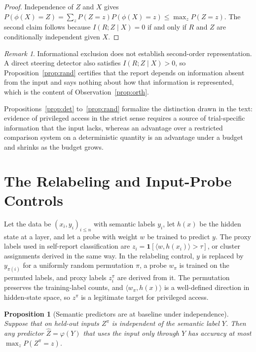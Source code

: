 \documentclass[11pt]{article}
\newtheorem{proposition}{Proposition}
\theoremstyle{definition}
\theoremstyle{remark}
\newtheorem{remark}{Remark}
\begin{document}
\begin{proof}
Independence of $Z$ and $X$ gives $P(\phi(X)=Z)=\sum_z P(Z=z)P(\phi(X)=z)\le\max_z P(Z=z)$. The second claim follows because $I(R;Z\mid X)=0$ if and only if $R$ and $Z$ are conditionally independent given $X$.
\end{proof}

\begin{remark}
Informational exclusion does not establish second-order representation. A direct steering detector also satisfies $I(R;Z\mid X)>0$, so Proposition~\ref{prop:rand} certifies that the report depends on information absent from the input and says nothing about how that information is represented, which is the content of Observation~\ref{prop:orth}.
\end{remark}

Propositions~\ref{prop:det} to~\ref{prop:rand} formalize the distinction drawn in the text: evidence of privileged access in the strict sense requires a source of trial-specific information that the input lacks, whereas an advantage over a restricted comparison system on a deterministic quantity is an advantage under a budget and shrinks as the budget grows.

\section{The Relabeling and Input-Probe Controls}\label{app:controls}

Let the data be $(x_i,y_i)_{i\le n}$ with semantic labels $y_i$, let $h(x)$ be the hidden state at a layer, and let a probe with weight $w$ be trained to predict $y$. The proxy labels used in self-report classification are $z_i=\mathbf{1}[\langle w,h(x_i)\rangle>\tau]$, or cluster assignments derived in the same way. In the relabeling control, $y$ is replaced by $y_{\pi(i)}$ for a uniformly random permutation $\pi$, a probe $w_\pi$ is trained on the permuted labels, and proxy labels $z^\pi_i$ are derived from it. The permutation preserves the training-label counts, and $\langle w_\pi,h(x)\rangle$ is a well-defined direction in hidden-state space, so $z^\pi$ is a legitimate target for privileged access.

\begin{proposition}[Semantic predictors are at baseline under independence]\label{prop:relabel}
Suppose that on held-out inputs $Z^\pi$ is independent of the semantic label $Y$. Then any predictor $\hat Z=\varphi(Y)$ that uses the input only through $Y$ has accuracy at most $\max_z P(Z^\pi=z)$.
\end{proposition}
\end{document}
